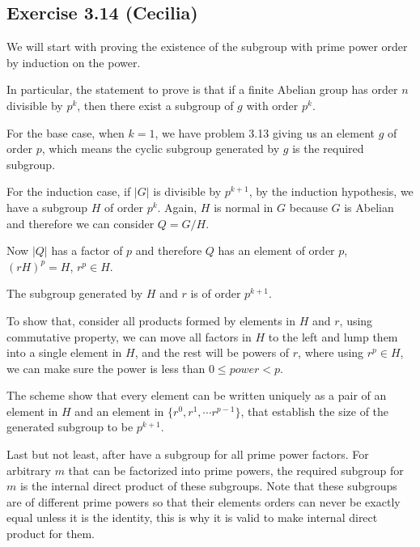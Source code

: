 \subsection*{Exercise 3.14 (Cecilia)}

We will start with proving the existence of the subgroup with prime power order by induction on the power.

In particular, the statement to prove is that if a finite Abelian group has order $ n $ divisible by $ p^k $, then there exist a subgroup of $ g $ with order $ p^k$.

For the base case, when $ k = 1 $, we have problem 3.13 giving us an element $ g $ of order $ p $, which means the cyclic subgroup generated by $ g $ is the required subgroup.

For the induction case, if $ |G| $ is divisible by $ p^{k+1} $, by the induction hypothesis, we have a subgroup $ H $ of order $ p^k $. Again, $ H $ is normal in $ G $ because $ G $ is Abelian and therefore we can consider $ Q = G/H $.

Now $ |Q| $ has a factor of $ p $ and therefore $ Q $ has an element of order $ p $, $ (rH)^p = H $, $ r^p \in H $.

The subgroup generated by $ H $ and $ r $ is of order $ p^{k+1} $.

To show that, consider all products formed by elements in $ H $ and $ r $, using commutative property, we can move all factors in $ H $ to the left and lump them into a single element in $ H $, and the rest will be powers of $ r $, where using $ r^p \in H $, we can make sure the power is less than $ 0 \le power < p $.

The scheme show that every element can be written uniquely as a pair of an element in $ H $ and an element in $ \{r^0, r^1, \cdots r^{p-1}\} $, that establish the size of the generated subgroup to be $ p^{k+1} $.

Last but not least, after have a subgroup for all prime power factors. For arbitrary $ m $ that can be factorized into prime powers, the required subgroup for $ m $ is the internal direct product of these subgroups. Note that these subgroups are of different prime powers so that their elements orders can never be exactly equal unless it is the identity, this is why it is valid to make internal direct product for them.